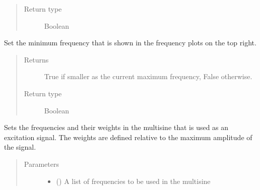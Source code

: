 \documentclass[letterpaper,10pt,english]{sphinxmanual}
\begin{document}
\begin{fulllineitems}
\begin{fulllineitems}
\begin{quote}
\begin{description}
\item[{Return type}] \leavevmode
\sphinxAtStartPar
Boolean

\end{description}\end{quote}

\end{fulllineitems}


\begin{fulllineitems}
\label{\detokenize{index:TiePieLCR_settings.TiePieLCR_settings.set_minimum_plot_frequency}}
\sphinxAtStartPar
Set the minimum frequency that is shown in the frequency plots on the top right.
\begin{quote}\begin{description}
\item[{Returns}] \leavevmode
\sphinxAtStartPar
True if smaller as the current maximum frequency, False otherwise.

\item[{Return type}] \leavevmode
\sphinxAtStartPar
Boolean

\end{description}\end{quote}

\end{fulllineitems}


\begin{fulllineitems}
\label{\detokenize{index:TiePieLCR_settings.TiePieLCR_settings.set_multisine}}
\sphinxAtStartPar
Sets the frequencies and their weights in the multisine that is used as an excitation signal. The weights are defined relative to the maximum amplitude of the signal.
\begin{quote}\begin{description}
\item[{Parameters}] \leavevmode\begin{itemize}
\item {} 
\sphinxAtStartPar
{} () \textendash{} A list of frequencies to be used in the multisine


\end{itemize}
\end{description}
\end{quote}
\end{fulllineitems}
\end{fulllineitems}
\end{document}
